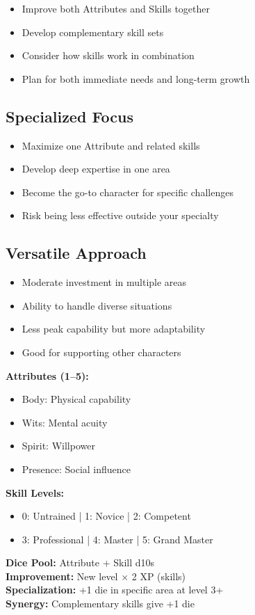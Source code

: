 \documentclass[11pt,twoside,openany]{book}
\begin{document}
\begin{itemize}
\item Improve both Attributes and Skills together
\item Develop complementary skill sets
\item Consider how skills work in combination
\item Plan for both immediate needs and long-term growth
\end{itemize}

\subsection*{Specialized Focus}

\begin{itemize}
\item Maximize one Attribute and related skills
\item Develop deep expertise in one area
\item Become the go-to character for specific challenges
\item Risk being less effective outside your specialty
\end{itemize}

\subsection*{Versatile Approach}

\begin{itemize}
\item Moderate investment in multiple areas
\item Ability to handle diverse situations
\item Less peak capability but more adaptability
\item Good for supporting other characters
\end{itemize}

\begin{tcolorbox}[colback=gray!5!white, colframe=gray!75!black, title=Attributes and Skills Quick Reference, fonttitle=\bfseries,breakable]
\textbf{Attributes (1--5):}
\begin{itemize}
\item Body: Physical capability
\item Wits: Mental acuity
\item Spirit: Willpower
\item Presence: Social influence
\end{itemize}

\textbf{Skill Levels:}
\begin{itemize}
\item 0: Untrained | 1: Novice | 2: Competent
\item 3: Professional | 4: Master | 5: Grand Master
\end{itemize}

\textbf{Dice Pool:} Attribute + Skill d10s\\
\textbf{Improvement:} New level × 2 XP (skills)\\
\textbf{Specialization:} +1 die in specific area at level 3+\\
\textbf{Synergy:} Complementary skills give +1 die
\end{tcolorbox}
\end{document}
